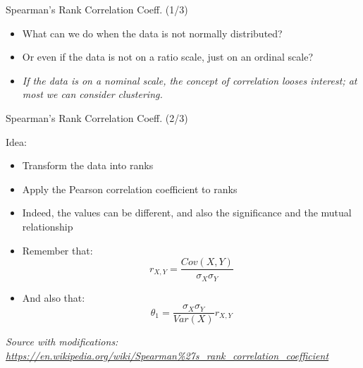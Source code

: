 \documentclass{beamer}
\begin{document}
\begin{frame}
{\centerline{Spearman's Rank Correlation Coeff. (1/3)}}

\begin{itemize}
   \item What can we do when the data is not normally distributed?
   \item Or even if the data is not on a ratio scale, just on an ordinal scale?\newline
   \item \textit{If the data is on a nominal scale, the concept of correlation looses interest; at most we can consider clustering.}
\end{itemize}


\end{frame}

\begin{frame}
{\centerline{Spearman's Rank Correlation Coeff. (2/3)}}
Idea:
\begin{itemize}
   \item Transform the data into ranks
   \item Apply the Pearson correlation coefficient to ranks
   \item Indeed, the values can be different, and also the significance and the mutual relationship
   \item Remember that:
   $$r_{X,Y} = \frac{Cov(X,Y)}{\sigma_X\sigma_Y}$$
   \item And also that:
   $$ \theta_1  = \frac{\sigma_X\sigma_Y}{Var(X)} r_{X,Y}   $$
\end{itemize}

\textit{\tiny
\vspace{-\baselineskip}
Source with modifications: \url{https://en.wikipedia.org/wiki/Spearman\%27s_rank_correlation_coefficient}}

\end{frame}
\end{document}
